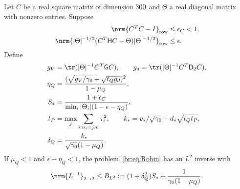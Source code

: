 \begin{proposition}\label{br:prop:Schur}
Let $C$ be a real square matrix of dimension $300$ and $\Theta$
a real diagonal matrix with nonzero entries. Suppose
\begin{equation}\label{br:eq:congruence}
 \begin{split}
 \nrm{C^TC-I}_{\rm row}&\le\epsilon_C<1,\\
 \nrm{|\Theta|^{-1/2}(C^T\mathsf HC-\Theta)|\Theta|^{-1/2}}_{\rm row}
 &\le\epsilon.
 \end{split}
\end{equation}
Define
\begin{equation}\label{br:eq:Schur-data}
 \begin{split}
 g_V&=\tr(|\Theta|^{-1}C^T\mathsf GC),\qquad
 g_d=\tr(|\Theta|^{-1}C^T\mathsf D_2C),\\
 \eta_Q&=\frac{(\sqrt{g_V/\gamma_0}+\sqrt{t_Qg_d})^2}{1-\mu_Q},\\
 S_*&=\frac{1+\epsilon_C}{\min_i|\Theta_i|(1-\epsilon-\eta_Q)},\\
 t_P&=\max_j\sum_{i:n_i=jm}\tau_i^2,\qquad
 k_*=v_*/\sqrt{\gamma_0}+d_*\sqrt{t_Qt_P},\\
 \delta_Q&=\frac{k_*}{\sqrt{\gamma_0}(1-\mu_Q)}.
 \end{split}
\end{equation}
If $\mu_Q<1$ and $\epsilon+\eta_Q<1$, the problem~\eqref{br:eq:Robin}
has an $L^2$ inverse with
\begin{equation}\label{br:eq:BLtwo}
 \nrm{L^{-1}}_{2\to2}\le B_{L^2}
 :=(1+\delta_Q^2)S_*+\frac1{\gamma_0(1-\mu_Q)}.
\end{equation}
\end{proposition}
